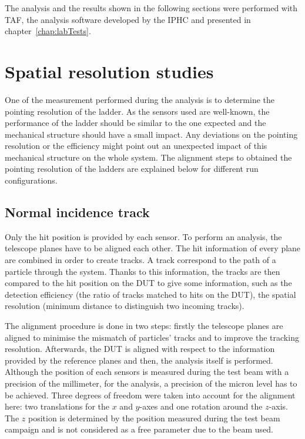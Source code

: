     The analysis and the results shown in the following sections were performed with \gls{TAF}, the analysis software developed by the IPHC and presented in chapter~\ref{chap:labTests}.

  \section{Spatial resolution studies}
   
    One of the measurement performed during the analysis is to determine the pointing resolution of the ladder.
    As the sensors used are well-known, the performance of the ladder should be similar to the one expected and the mechanical structure should have a small impact.
    Any deviations on the pointing resolution or the efficiency might point out an unexpected impact of this mechanical structure on the whole system.
    The alignment steps to obtained the pointing resolution of the ladders are explained below for different run configurations. 

    \subsection{Normal incidence track}

    Only the hit position is provided by each sensor.
    To perform an analysis, the telescope planes have to be aligned each other.
    The hit information of every plane are combined in order to create tracks. 
    A track correspond to the path of a particle through the system.
    Thanks to this information, the tracks are then compared to the hit position on the \gls{DUT} to give some information, such as the detection efficiency (the ratio of tracks matched to hits on the \gls{DUT}), the spatial resolution (minimum distance to distinguish two incoming tracks).

    The alignment procedure is done in two steps: firstly the telescope planes are aligned to minimise the mismatch of particles' tracks and to improve the tracking resolution.
    Afterwards, the \gls{DUT} is aligned with respect to the information provided by the reference planes and then, the analysis itself is performed.
    Although the position of each sensors is measured during the test beam with a precision of the millimeter, for the analysis, a precision of the micron level has to be achieved.
    Three degrees of freedom were taken into account for the alignment here: two translations for the $x$ and $y$-axes and one rotation around the $z$-axis.
    The $z$ position is determined by the position measured during the test beam campaign and is not considered as a free parameter due to the beam used.

